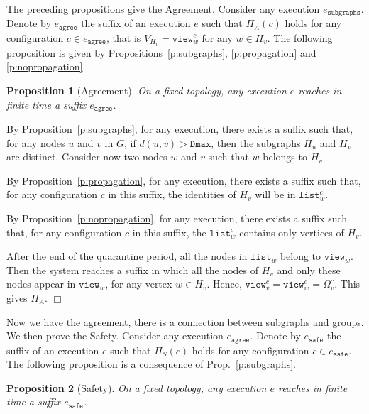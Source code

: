 \documentclass[11pt,english]{article}
\newtheorem{proposition}{Proposition}
\newenvironment{proof}[1][0cm]{
  \begin{list}{\bf Proof.~}{
      \setlength{\itemindent}{0cm}
      \setlength{\labelsep}{0cm}
      \setlength{\labelwidth}{#1}
      \setlength{\leftmargin}{#1}
    \item
    }
}{\hfill$\Box$
  \end{list}
}
\begin{document}
The preceding propositions give the Agreement.  Consider any execution
$e_\texttt{subgraphs}$.  Denote by $e_\texttt{agree}$ the suffix of an execution
$e$ such that $\Pi_A(c)$ holds for any configuration $c\in e_\texttt{agree}$,
that is $V_{H_v} = \texttt{view}_w^c$ for any $w \in H_v$.
The following proposition is given by Propositions~\ref{p:subgraphs},
\ref{p:propagation} and \ref{p:nopropagation}.

\begin{proposition}[Agreement]\label{p:agree}
  On a fixed topology, any execution $e$ reaches in finite time a suffix
  $e_\texttt{agree}$.
\end{proposition}

\begin{proof}
  By Proposition~\ref{p:subgraphs}, for any execution, there exists a suffix
  such that, for any nodes $u$ and $v$ in $G$, if $d(u,v) > \texttt{Dmax}$,
  then the subgraphs $H_u$ and $H_v$ are distinct. Consider now two nodes $w$
  and $v$ such that $w$ belongs to $H_v$

  By Proposition~\ref{p:propagation}, for any execution, there exists a suffix
  such that, for any configuration $c$ in this suffix, the identities of $H_v$
  will be in $\texttt{list}_w^c$.

  By Proposition~\ref{p:nopropagation}, for any execution, there exists a suffix
  such that, for any configuration $c$ in this suffix, the $\texttt{list}_w^c$
  contains only vertices of $H_v$.

  After the end of the quarantine period, all the nodes in $\texttt{list}_w$
  belong to $\texttt{view}_w$.  Then the system reaches a suffix in which all
  the nodes of $H_v$ and only these nodes appear in $\texttt{view}_w$, for any
  vertex $w \in H_v$. Hence, $\texttt{view}_v^c = \texttt{view}_w^c =
  \Omega_v^c$. This gives $\Pi_A$.
\end{proof}


Now we have the agreement, there is a connection between subgraphs and
groups. We then prove the Safety.
Consider any execution $e_\texttt{agree}$. Denote by $e_\texttt{safe}$ the suffix of an execution $e$ such that $\Pi_S(c)$
holds for any configuration $c\in e_\texttt{safe}$. The following proposition is
a consequence of Prop.~\ref{p:subgraphs}.


\begin{proposition}[Safety]\label{p:safe}
On a fixed topology, any execution $e$ reaches in finite time a suffix $e_\texttt{safe}$.
\end{proposition}
\end{document}
